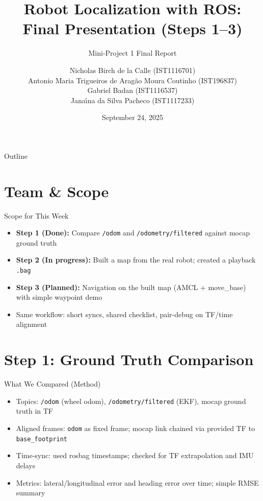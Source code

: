 \documentclass[10pt]{beamer}
\title[Robot Localization with ROS]{\texorpdfstring{Robot Localization with ROS: \\Final Presentation (Steps 1–3)}{Robot Localization with ROS: Final Presentation (Steps 1–3)}}
\subtitle{Mini-Project 1 Final Report}
\author{Nicholas Birch de la Calle (IST1116701) \\
Antonio Maria Trigueiros de Arag\~{a}o Moura Coutinho (IST196837) \\
Gabriel Badan (IST1116537) \\
Jana\'{\i}na da Silva Pacheco (IST1117233)}
\institute{Instituto Superior Técnico}
\date{September 24, 2025}
\begin{document}
\begin{frame}
\titlepage
\end{frame}

\begin{frame}{Outline}
\tableofcontents
\end{frame}

\section{Team \& Scope}

\begin{frame}{Scope for This Week}
\begin{itemize}
    \item \textbf{Step 1 (Done):} Compare \texttt{/odom} and \texttt{/odometry/filtered} against mocap ground truth
    \item \textbf{Step 2 (In progress):} Built a map from the real robot; created a playback \texttt{.bag}
    \item \textbf{Step 3 (Planned):} Navigation on the built map (AMCL + move\_base) with simple waypoint demo
    \item Same workflow: short syncs, shared checklist, pair-debug on TF/time alignment
\end{itemize}
\end{frame}

\section{Step 1: Ground Truth Comparison}

\begin{frame}{What We Compared (Method)}
\begin{itemize}
    \item Topics: \texttt{/odom} (wheel odom), \texttt{/odometry/filtered} (EKF), mocap ground truth in TF
    \item Aligned frames: \texttt{odom} as fixed frame; mocap link chained via provided TF to \texttt{base\_footprint}
    \item Time-sync: used rosbag timestamps; checked for TF extrapolation and IMU delays
    \item Metrics: lateral/longitudinal error and heading error over time; simple RMSE summary
\end{itemize}
\end{frame}
\end{document}

